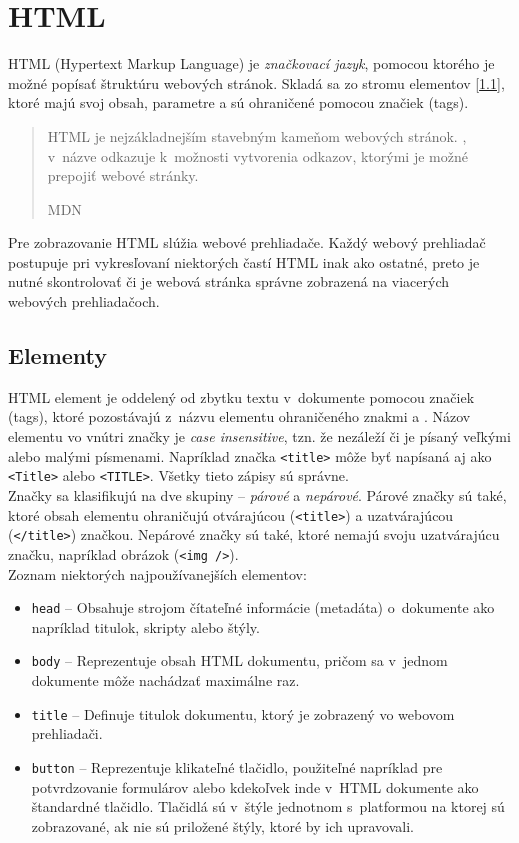 \section{HTML}
\label{theory:HTML}
HTML (Hypertext Markup Language) je \emph{značkovací jazyk}, pomocou ktorého je možné popísať štruktúru webových stránok. Skladá sa zo stromu elementov [\ref{theory:HTML:elements}], ktoré majú svoj obsah, parametre a sú ohraničené pomocou značiek (tags).

\blockquote[MDN \cite{MDN}]{HTML je nejzákladnejším stavebným kameňom webových stránok. , v~názve odkazuje k~možnosti vytvorenia odkazov, ktorými je možné prepojiť webové stránky.}

\noindent Pre zobrazovanie HTML slúžia webové prehliadače. Každý webový prehliadač postupuje pri vykresľovaní niektorých častí HTML inak ako ostatné, preto je nutné skontrolovať či je webová stránka správne zobrazená na viacerých webových prehliadačoch.

\subsection{Elementy}
\label{theory:HTML:elements}
HTML element je oddelený od zbytku textu v~dokumente pomocou značiek (tags), ktoré pozostávajú z~názvu elementu ohraničeného znakmi \uv{\texttt{<}} a \uv{\texttt{>}}. Názov elementu vo vnútri značky je \emph{case insensitive}, tzn. že nezáleží či je písaný veľkými alebo malými písmenami. Napríklad značka \texttt{<title>} môže byť napísaná aj ako \texttt{<Title>} alebo \texttt{<TITLE>}. Všetky tieto zápisy sú správne. \cite{MDN} \\

\noindent Značky sa klasifikujú na dve skupiny -- \emph{párové} a \emph{nepárové}. Párové značky sú také, ktoré obsah elementu ohraničujú otvárajúcou (\texttt{<title>}) a uzatvárajúcou (\texttt{</title>}) značkou. Nepárové značky sú také, ktoré nemajú svoju uzatvárajúcu značku, napríklad obrázok (\texttt{<img />}). \\

\noindent Zoznam niektorých najpoužívanejších elementov:
\begin{itemize}
	\item \texttt{head} -- Obsahuje strojom čítateľné informácie (metadáta) o~dokumente ako napríklad titulok, skripty alebo štýly. \cite{MDN}
	\item \texttt{body} -- Reprezentuje obsah HTML dokumentu, pričom sa v~jednom dokumente môže nachádzať maximálne raz. \cite{MDN}
	\item \texttt{title} -- Definuje titulok dokumentu, ktorý je zobrazený vo webovom prehliadači. \cite{MDN}
	\item \texttt{button} -- Reprezentuje klikateľné tlačidlo, použiteľné napríklad pre potvrdzovanie formulárov alebo kdekoľvek inde v~HTML dokumente ako štandardné tlačidlo. Tlačidlá sú v~štýle jednotnom s~platformou na ktorej sú zobrazované, ak nie sú priložené štýly, ktoré by ich upravovali. \cite{MDN}
\end{itemize}


